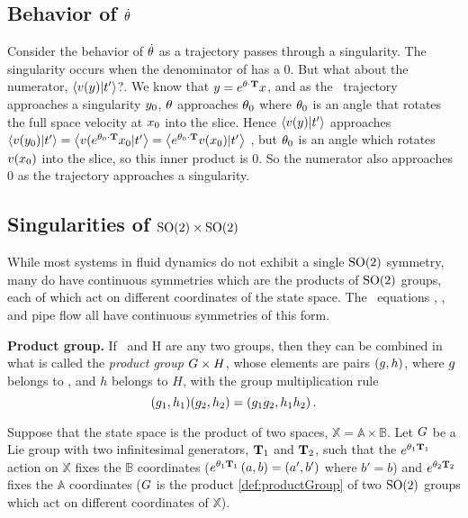 {\subsection{Behavior of $\dot{{\bf \theta}}$}

Consider the behavior of $\dot{{\bf \theta}}$ as a trajectory passes through a singularity. The singularity occurs when the denominator of  has a 0. But what about the numerator, $\left\langle {\ensuremath{v}(\ensuremath{y})}|{t'_{}} \right\rangle$?. We know that $y=e^{{\bf \theta}\cdot\mathbf{T}}x$, and as the \reducedsp\ trajectory approaches a singularity $y_0$, ${\bf \theta}$ approaches ${\bf \theta}_0$ where ${\bf \theta}_0$ is an angle that rotates the full space velocity at $x_0$ into the slice. Hence $\left\langle {\ensuremath{v}(\ensuremath{y})}|{t'_{}} \right\rangle$ approaches $\left\langle {\ensuremath{v}(\ensuremath{y}_0)}|{t'_{}} \right\rangle=\left\langle {\ensuremath{v}(e^{\ensuremath{{\bf \theta}}_0\cdot\ensuremath{\mathbf{T}}}\ensuremath{x}_0}|{t'_{}} \right\rangle=\left\langle {e^{\ensuremath{{\bf \theta}}_0\cdot\ensuremath{\mathbf{T}}}\ensuremath{v}(\ensuremath{x}_0)}|{t'_{}} \right\rangle$
, but ${\bf \theta}_0$ is an angle which rotates $v(x_0)$ into the slice, so this inner product is 0. So the numerator also approaches 0 as the trajectory approaches a singularity.

\subsection{Singularities of $\textrm{SO}(2) \times \textrm{SO}(2)$}

While most systems in fluid dynamics do not exhibit a single $\textrm{SO}(2)$ symmetry, many do have continuous symmetries which are the products of $\textrm{SO}(2)$ groups, each of which act on different coordinates of the state space. The \KS\ equations , {\pCf} , and pipe flow  all have continuous symmetries of this form.

\begin{definition}
\label{def:productGroup}
\textbf{Product group.}
If \Group\ and H are any two groups, then they can be combined in
what is called the {\em product group} $G \times H$, whose
elements are pairs $(g,h)$, where $g$ belongs to \Group, and
$h$ belongs to $H$, with the group multiplication rule
\[
(g_1,h_1)(g_2,h_2)=(g_1 g_2,h_1 h_2)
\,.
\]
\end{definition}

Suppose that the state space is the product of two spaces, $\mathbb{X}=\mathbb{A} \times \mathbb{B}$.
Let $G$ be a Lie group with two infinitesimal generators, $\mathbf{T}_1$ and $\mathbf{T}_2$, such that the $e^{{\bf \theta}_1 \mathbf{T}_1}$ action on $\mathbb{X}$ fixes the $\mathbb{B}$ coordinates ($e^{{\bf \theta}_1 \mathbf{T}_1} \, (a,b)=(a',b')$ where $b'=b$) and $e^{{\bf \theta}_2 \mathbf{T}_2}$ fixes the $\mathbb{A}$ coordinates ($G$ is the product \ref{def:productGroup} of two $\textrm{SO}(2)$ groups which act on different coordinates of $\mathbb{X}$).

}
